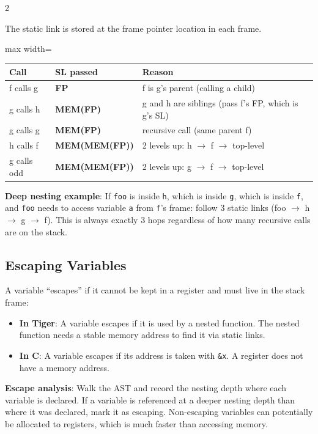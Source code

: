 \documentclass[9pt,landscape]{extarticle}
\begin{document}
\begin{multicols}{2}
\begin{exambox}
The static link is stored at the frame pointer location in each frame.

\begin{adjustbox}{max width=\linewidth}
\begin{tabular}{@{}lll@{}}
\textbf{Call} & \textbf{SL passed} & \textbf{Reason} \\
\hline
f calls g & \textbf{FP} & f is g's parent (calling a child) \\
g calls h & \textbf{MEM(FP)} & g and h are siblings (pass f's FP, which is g's SL) \\
g calls g & \textbf{MEM(FP)} & recursive call (same parent f) \\
h calls f & \textbf{MEM(MEM(FP))} & 2 levels up: h $\to$ f $\to$ top-level \\
g calls odd & \textbf{MEM(MEM(FP))} & 2 levels up: g $\to$ f $\to$ top-level \\
\end{tabular}
\end{adjustbox}

\textbf{Deep nesting example}: If \texttt{foo} is inside \texttt{h}, which is inside \texttt{g}, which is inside \texttt{f}, and \texttt{foo} needs to access variable \texttt{a} from \texttt{f}'s frame: follow 3 static links (foo $\to$ h $\to$ g $\to$ f). This is always exactly 3 hops regardless of how many recursive calls are on the stack.
\end{exambox}

\subsection{Escaping Variables}

A variable ``escapes'' if it cannot be kept in a register and must live in the stack frame:
\begin{itemize}
  \item \textbf{In Tiger}: A variable escapes if it is used by a nested function. The nested function needs a stable memory address to find it via static links.
  \item \textbf{In C}: A variable escapes if its address is taken with \texttt{\&x}. A register does not have a memory address.
\end{itemize}

\textbf{Escape analysis}: Walk the AST and record the nesting depth where each variable is declared. If a variable is referenced at a deeper nesting depth than where it was declared, mark it as escaping. Non-escaping variables can potentially be allocated to registers, which is much faster than accessing memory.


\end{multicols}
\end{document}
